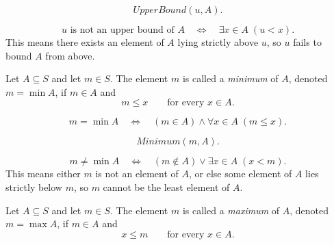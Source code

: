 \begin{remark*}
\[
UpperBound(u,A).
\]
\end{remark*}

\begin{remark*}
\[
u \text{ is not an upper bound of } A
\quad\Longleftrightarrow\quad
\exists x \in A \; (u < x).
\]
This means there exists an element of $A$ lying strictly above $u$, so $u$ fails to bound $A$
from above.
\end{remark*}

\begin{tcolorbox}[colback=propbox, colframe=propborder, arc=2pt,
  left=6pt, right=6pt, top=4pt, bottom=4pt,
  title={\small\textbf{Definition (Minimum)}},
  fonttitle=\small\bfseries]
\begin{definition}
\label{def:minimum}
Let $A \subseteq S$ and let $m \in S$. The element $m$ is called a
\emph{minimum} of $A$, denoted $m = \min A$, if $m \in A$ and
\[
m \le x
\qquad \text{for every } x \in A.
\]
\end{definition}
\end{tcolorbox}

\begin{remark*}
\[
m = \min A
\quad\Longleftrightarrow\quad
(m \in A) \land \forall x \in A \; (m \le x).
\]
\end{remark*}

\begin{remark*}
\[
Minimum(m,A).
\]
\end{remark*}

\begin{remark*}
\[
m \neq \min A
\quad\Longleftrightarrow\quad
(m \notin A) \lor \exists x \in A \; (x < m).
\]
This means either $m$ is not an element of $A$, or else some element of $A$ lies strictly
below $m$, so $m$ cannot be the least element of $A$.
\end{remark*}

\begin{tcolorbox}[colback=propbox, colframe=propborder, arc=2pt,
  left=6pt, right=6pt, top=4pt, bottom=4pt,
  title={\small\textbf{Definition (Maximum)}},
  fonttitle=\small\bfseries]
\begin{definition}
\label{def:maximum}
Let $A \subseteq S$ and let $m \in S$. The element $m$ is called a
\emph{maximum} of $A$, denoted $m = \max A$, if $m \in A$ and
\[
x \le m
\qquad \text{for every } x \in A.
\]
\end{definition}
\end{tcolorbox}

